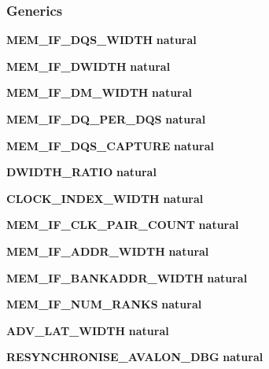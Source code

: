 \subsubsection*{Generics}
 \begin{DoxyCompactItemize}
\item 
{\bf M\+E\+M\+\_\+\+I\+F\+\_\+\+D\+Q\+S\+\_\+\+W\+I\+D\+TH} {\bfseries {\bfseries \textcolor{comment}{natural}\textcolor{vhdlchar}{ }}}
\item 
{\bf M\+E\+M\+\_\+\+I\+F\+\_\+\+D\+W\+I\+D\+TH} {\bfseries {\bfseries \textcolor{comment}{natural}\textcolor{vhdlchar}{ }}}
\item 
{\bf M\+E\+M\+\_\+\+I\+F\+\_\+\+D\+M\+\_\+\+W\+I\+D\+TH} {\bfseries {\bfseries \textcolor{comment}{natural}\textcolor{vhdlchar}{ }}}
\item 
{\bf M\+E\+M\+\_\+\+I\+F\+\_\+\+D\+Q\+\_\+\+P\+E\+R\+\_\+\+D\+QS} {\bfseries {\bfseries \textcolor{comment}{natural}\textcolor{vhdlchar}{ }}}
\item 
{\bf M\+E\+M\+\_\+\+I\+F\+\_\+\+D\+Q\+S\+\_\+\+C\+A\+P\+T\+U\+RE} {\bfseries {\bfseries \textcolor{comment}{natural}\textcolor{vhdlchar}{ }}}
\item 
{\bf D\+W\+I\+D\+T\+H\+\_\+\+R\+A\+T\+IO} {\bfseries {\bfseries \textcolor{comment}{natural}\textcolor{vhdlchar}{ }}}
\item 
{\bf C\+L\+O\+C\+K\+\_\+\+I\+N\+D\+E\+X\+\_\+\+W\+I\+D\+TH} {\bfseries {\bfseries \textcolor{comment}{natural}\textcolor{vhdlchar}{ }}}
\item 
{\bf M\+E\+M\+\_\+\+I\+F\+\_\+\+C\+L\+K\+\_\+\+P\+A\+I\+R\+\_\+\+C\+O\+U\+NT} {\bfseries {\bfseries \textcolor{comment}{natural}\textcolor{vhdlchar}{ }}}
\item 
{\bf M\+E\+M\+\_\+\+I\+F\+\_\+\+A\+D\+D\+R\+\_\+\+W\+I\+D\+TH} {\bfseries {\bfseries \textcolor{comment}{natural}\textcolor{vhdlchar}{ }}}
\item 
{\bf M\+E\+M\+\_\+\+I\+F\+\_\+\+B\+A\+N\+K\+A\+D\+D\+R\+\_\+\+W\+I\+D\+TH} {\bfseries {\bfseries \textcolor{comment}{natural}\textcolor{vhdlchar}{ }}}
\item 
{\bf M\+E\+M\+\_\+\+I\+F\+\_\+\+N\+U\+M\+\_\+\+R\+A\+N\+KS} {\bfseries {\bfseries \textcolor{comment}{natural}\textcolor{vhdlchar}{ }}}
\item 
{\bf A\+D\+V\+\_\+\+L\+A\+T\+\_\+\+W\+I\+D\+TH} {\bfseries {\bfseries \textcolor{comment}{natural}\textcolor{vhdlchar}{ }}}
\item 
{\bf R\+E\+S\+Y\+N\+C\+H\+R\+O\+N\+I\+S\+E\+\_\+\+A\+V\+A\+L\+O\+N\+\_\+\+D\+BG} {\bfseries {\bfseries \textcolor{comment}{natural}\textcolor{vhdlchar}{ }}}

\end{DoxyCompactItemize}
